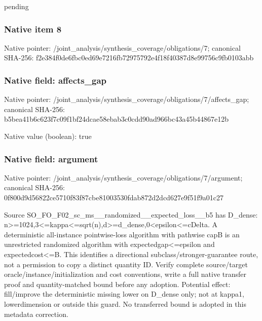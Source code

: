 \documentclass[10pt,a4paper]{article}
\begin{document}
\begingroup\raggedright\sloppy pending\par\endgroup

\subsubsection{Native item 8}
Native pointer: /joint\_\allowbreak{}analysis/synthesis\_\allowbreak{}coverage/obligations/7; canonical SHA-256: f2e384f0de6fbc0ed69e7216fb72975792e4f18f40387d8e99756c9fb0103abb

\subsubsection{Native field: affects\_\allowbreak{}gap}
Native pointer: /joint\_\allowbreak{}analysis/synthesis\_\allowbreak{}coverage/obligations/7/affects\_\allowbreak{}gap; canonical SHA-256: b5bea41b6c623f7c09f1bf24dcae58ebab3c0cdd90ad966bc43a45b44867e12b

Native value (boolean): true

\subsubsection{Native field: argument}
Native pointer: /joint\_\allowbreak{}analysis/synthesis\_\allowbreak{}coverage/obligations/7/argument; canonical SHA-256: 0f800d9d56822ce5710f83f87cbe81003530fdab872d2dcd627e9f51f9a01c27

\begingroup\raggedright\sloppy Source SO\_\allowbreak{}FO\_\allowbreak{}F02\_\allowbreak{}sc\_\allowbreak{}ms\_\allowbreak{}\_\allowbreak{}randomized\_\allowbreak{}\_\allowbreak{}expected\_\allowbreak{}loss\_\allowbreak{}\_\allowbreak{}b5 has D\_\allowbreak{}dense:\allowbreak{} n>=\allowbreak{}1024,\allowbreak{}3<=\allowbreak{}kappa<=\allowbreak{}sqrt(n),\allowbreak{}d>=\allowbreak{}d\_\allowbreak{}dense,\allowbreak{}0<epsilon<=\allowbreak{}cDelta. A deterministic all-instance pointwise-loss algorithm with pathwise capB is an unrestricted randomized algorithm with expectedgap<=\allowbreak{}epsilon and expectedcost<=\allowbreak{}B. This identifies a directional subclass/\allowbreak{}stronger-guarantee route,\allowbreak{} not a permission to copy a distinct quantity ID. Verify complete source/\allowbreak{}target oracle/\allowbreak{}instance/\allowbreak{}initialization and cost conventions,\allowbreak{} write a full native transfer proof and quantity-matched bound before any adoption. Potential effect:\allowbreak{} fill/\allowbreak{}improve the deterministic missing lower on D\_\allowbreak{}dense only;\allowbreak{} not at kappa1,\allowbreak{} lowerdimension or outside this guard. No transferred bound is adopted in this metadata correction.\par\endgroup
\end{document}
